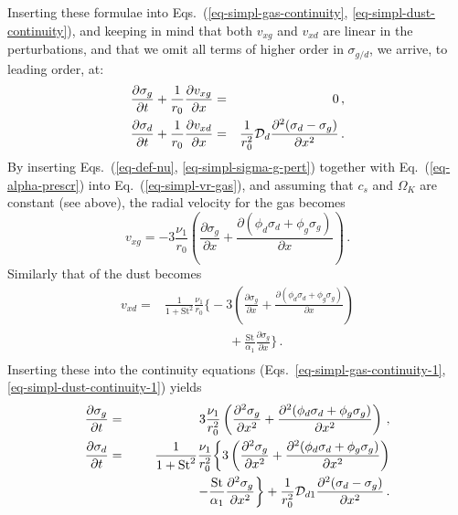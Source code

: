 \documentclass{aa}
\def\comma{\,,}
\def\fullstop{\,.}
\begin{document}
Inserting these formulae into Eqs.~(\ref{eq-simpl-gas-continuity},
\ref{eq-simpl-dust-continuity}), and keeping in mind that both $v_{xg}$ and
$v_{xd}$ are linear in the perturbations, and that we omit all terms
of higher order in $\sigma_{g/d}$, we arrive, to leading order, at:
\begin{eqnarray}
\frac{\partial \sigma_{g}}{\partial t} +
  \frac{1}{r_0}\frac{\partial v_{xg}}{\partial x}
   &=& 0\comma\label{eq-simpl-gas-continuity-1}\\
\frac{\partial \sigma_{d}}{\partial t} +
  \frac{1}{r_0}\frac{\partial v_{xd}}{\partial x}
  &=&
  \frac{1}{r_0^2}{\cal D}_d
  \frac{\partial^2(\sigma_d-\sigma_g)}{\partial x^2}\fullstop
  \label{eq-simpl-dust-continuity-1}
\end{eqnarray}
By inserting Eqs.~(\ref{eq-def-nu}, \ref{eq-simpl-sigma-g-pert}) together with
Eq.~(\ref{eq-alpha-prescr}) into Eq.~(\ref{eq-simpl-vr-gas}), and assuming
that $c_s$ and $\Omega_K$ are constant (see above), the radial velocity for the
gas becomes
\begin{equation}
  v_{xg} = - 3\frac{\nu_1}{r_0}\left(\frac{\partial\sigma_g}{\partial x}
  +\frac{\partial(\phi_d\sigma_d+\phi_g\sigma_g)}{\partial x}\right)\fullstop
\end{equation}
Similarly that of the dust becomes
\begin{equation}
\begin{split}
  v_{xd} =&
  \frac{1}{1+\mathrm{St}^2}\frac{\nu_1}{r_0}\bigg\{
  - 3\left(\frac{\partial\sigma_g}{\partial x}
  +\frac{\partial(\phi_d\sigma_d+\phi_g\sigma_g)}{\partial x}\right)\\
&  \qquad\qquad\quad
  +\frac{\mathrm{St}}{\alpha_1}
  \frac{\partial\sigma_g}{\partial x}\bigg\}\fullstop\\
\end{split}
\end{equation}
Inserting these into the continuity equations
(Eqs.~\ref{eq-simpl-gas-continuity-1},
  \ref{eq-simpl-dust-continuity-1}) yields
\begin{eqnarray}
  \frac{\partial\sigma_g}{\partial t}
  &=& 3\frac{\nu_1}{r_0^2}\left(\frac{\partial^2\sigma_g}{\partial x^2}
  +\frac{\partial^2(\phi_d\sigma_d+\phi_g\sigma_g)}{\partial x^2}\right)\comma\\
  \frac{\partial\sigma_d}{\partial t} &=&
  \frac{1}{1+\mathrm{St}^2}\frac{\nu_1}{r_0^2}\bigg\{
  3\left(\frac{\partial^2\sigma_g}{\partial x^2}
  +\frac{\partial^2(\phi_d\sigma_d+\phi_g\sigma_g)}{\partial x^2}\right)
   \nonumber\\
 & &  \qquad\qquad\quad -\frac{\mathrm{St}}{\alpha_1}
  \frac{\partial^2\sigma_g}{\partial x^2}\bigg\}
  + \frac{1}{r_0^2}{\cal D}_{d1}
  \frac{\partial^2(\sigma_d-\sigma_g)}{\partial x^2} \fullstop
\end{eqnarray}
\end{document}
